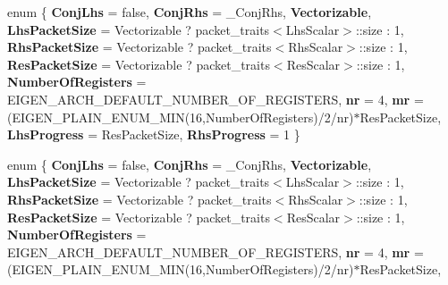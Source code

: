 \begin{DoxyCompactItemize}
\item 
\mbox{\label{class_eigen_1_1internal_1_1gebp__traits_3_01_real_scalar_00_01std_1_1complex_3_01_real_scalar_01f99740ceef5f07e0f3738974eb65d89c_a7b202fda8915c1cb0be2677602c3f260}} 
enum \{ \newline
{\bfseries Conj\+Lhs} = false, 
{\bfseries Conj\+Rhs} = \+\_\+\+Conj\+Rhs, 
{\bfseries Vectorizable}, 
{\bfseries Lhs\+Packet\+Size} = Vectorizable ? packet\+\_\+traits$<$Lhs\+Scalar$>$\+:\+:size \+: 1, 
\newline
{\bfseries Rhs\+Packet\+Size} = Vectorizable ? packet\+\_\+traits$<$Rhs\+Scalar$>$\+:\+:size \+: 1, 
{\bfseries Res\+Packet\+Size} = Vectorizable ? packet\+\_\+traits$<$Res\+Scalar$>$\+:\+:size \+: 1, 
{\bfseries Number\+Of\+Registers} = E\+I\+G\+E\+N\+\_\+\+A\+R\+C\+H\+\_\+\+D\+E\+F\+A\+U\+L\+T\+\_\+\+N\+U\+M\+B\+E\+R\+\_\+\+O\+F\+\_\+\+R\+E\+G\+I\+S\+T\+E\+RS, 
{\bfseries nr} = 4, 
\newline
{\bfseries mr} = (E\+I\+G\+E\+N\+\_\+\+P\+L\+A\+I\+N\+\_\+\+E\+N\+U\+M\+\_\+\+M\+IN(16,Number\+Of\+Registers)/2/nr)$\ast$\+Res\+Packet\+Size, 
{\bfseries Lhs\+Progress} = Res\+Packet\+Size, 
{\bfseries Rhs\+Progress} = 1
 \}
\item 
\mbox{\label{class_eigen_1_1internal_1_1gebp__traits_3_01_real_scalar_00_01std_1_1complex_3_01_real_scalar_01f99740ceef5f07e0f3738974eb65d89c_abd18cf3068029a8ea519aa6bd83f5bf1}} 
enum \{ \newline
{\bfseries Conj\+Lhs} = false, 
{\bfseries Conj\+Rhs} = \+\_\+\+Conj\+Rhs, 
{\bfseries Vectorizable}, 
{\bfseries Lhs\+Packet\+Size} = Vectorizable ? packet\+\_\+traits$<$Lhs\+Scalar$>$\+:\+:size \+: 1, 
\newline
{\bfseries Rhs\+Packet\+Size} = Vectorizable ? packet\+\_\+traits$<$Rhs\+Scalar$>$\+:\+:size \+: 1, 
{\bfseries Res\+Packet\+Size} = Vectorizable ? packet\+\_\+traits$<$Res\+Scalar$>$\+:\+:size \+: 1, 
{\bfseries Number\+Of\+Registers} = E\+I\+G\+E\+N\+\_\+\+A\+R\+C\+H\+\_\+\+D\+E\+F\+A\+U\+L\+T\+\_\+\+N\+U\+M\+B\+E\+R\+\_\+\+O\+F\+\_\+\+R\+E\+G\+I\+S\+T\+E\+RS, 
{\bfseries nr} = 4, 
\newline
{\bfseries mr} = (E\+I\+G\+E\+N\+\_\+\+P\+L\+A\+I\+N\+\_\+\+E\+N\+U\+M\+\_\+\+M\+IN(16,Number\+Of\+Registers)/2/nr)$\ast$\+Res\+Packet\+Size, 

\end{DoxyCompactItemize}
